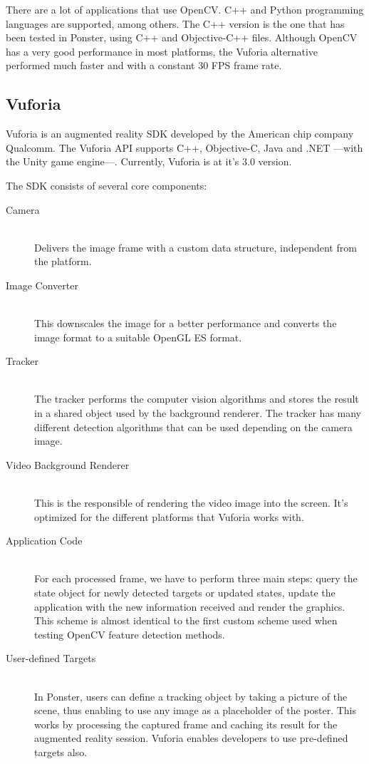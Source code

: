 There are a lot of applications that use OpenCV. C++ and Python programming
languages are supported, among others. The C++ version is the one that has been
tested in Ponster, using C++ and Objective-C++ files. Although OpenCV has a
very good performance in most platforms, the Vuforia alternative performed much
faster and with a constant 30 FPS frame rate.

\subsection{Vuforia}
\label{sec:vuforia}
Vuforia is an augmented reality SDK developed by the American chip company
Qualcomm. The Vuforia API supports C++, Objective-C, Java and .NET
---with the Unity game engine---. Currently, Vuforia is at it's 3.0 version. 

The SDK consists of several core components\cite{vuforiasdk01}: 
\begin{description}
\item [Camera] \hfill \\
Delivers the image frame with a custom data structure, independent from the
platform.
\item [Image Converter] \hfill \\
This downscales the image for a better performance and converts the image format to
a suitable OpenGL ES format.
\item [Tracker] \hfill \\
The tracker performs the computer vision algorithms and stores the result in a
shared object used by the background renderer. The tracker has many different
detection algorithms that can be used depending on the camera image.
\item [Video Background Renderer] \hfill \\
This is the responsible of rendering the video image into the screen. It's optimized
for the different platforms that Vuforia works with.
\item [Application Code] \hfill \\
For each processed frame, we have to perform three main steps: query the state
object for newly detected targets or updated states, update the application with the
new information received and render the graphics. This scheme is almost identical to
the first custom scheme used when testing OpenCV feature detection methods.
\item [User-defined Targets] \hfill \\
In Ponster, users can define a tracking object by taking a picture of the scene,
thus enabling to use any image as a placeholder of the poster. This works by
processing the captured frame and caching its result for the augmented reality
session. Vuforia enables developers to use pre-defined targets also.
\end{description}

